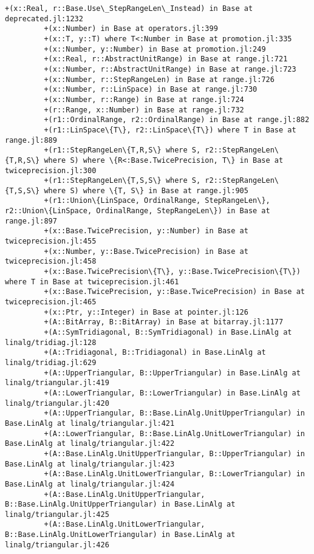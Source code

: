 \documentclass[11pt]{article}
\begin{document}
\begin{Verbatim}[commandchars=\\\{\}]
         +(x::Real, r::Base.Use\_StepRangeLen\_Instead) in Base at deprecated.jl:1232
         +(x::Number) in Base at operators.jl:399
         +(x::T, y::T) where T<:Number in Base at promotion.jl:335
         +(x::Number, y::Number) in Base at promotion.jl:249
         +(x::Real, r::AbstractUnitRange) in Base at range.jl:721
         +(x::Number, r::AbstractUnitRange) in Base at range.jl:723
         +(x::Number, r::StepRangeLen) in Base at range.jl:726
         +(x::Number, r::LinSpace) in Base at range.jl:730
         +(x::Number, r::Range) in Base at range.jl:724
         +(r::Range, x::Number) in Base at range.jl:732
         +(r1::OrdinalRange, r2::OrdinalRange) in Base at range.jl:882
         +(r1::LinSpace\{T\}, r2::LinSpace\{T\}) where T in Base at range.jl:889
         +(r1::StepRangeLen\{T,R,S\} where S, r2::StepRangeLen\{T,R,S\} where S) where \{R<:Base.TwicePrecision, T\} in Base at twiceprecision.jl:300
         +(r1::StepRangeLen\{T,S,S\} where S, r2::StepRangeLen\{T,S,S\} where S) where \{T, S\} in Base at range.jl:905
         +(r1::Union\{LinSpace, OrdinalRange, StepRangeLen\}, r2::Union\{LinSpace, OrdinalRange, StepRangeLen\}) in Base at range.jl:897
         +(x::Base.TwicePrecision, y::Number) in Base at twiceprecision.jl:455
         +(x::Number, y::Base.TwicePrecision) in Base at twiceprecision.jl:458
         +(x::Base.TwicePrecision\{T\}, y::Base.TwicePrecision\{T\}) where T in Base at twiceprecision.jl:461
         +(x::Base.TwicePrecision, y::Base.TwicePrecision) in Base at twiceprecision.jl:465
         +(x::Ptr, y::Integer) in Base at pointer.jl:126
         +(A::BitArray, B::BitArray) in Base at bitarray.jl:1177
         +(A::SymTridiagonal, B::SymTridiagonal) in Base.LinAlg at linalg/tridiag.jl:128
         +(A::Tridiagonal, B::Tridiagonal) in Base.LinAlg at linalg/tridiag.jl:629
         +(A::UpperTriangular, B::UpperTriangular) in Base.LinAlg at linalg/triangular.jl:419
         +(A::LowerTriangular, B::LowerTriangular) in Base.LinAlg at linalg/triangular.jl:420
         +(A::UpperTriangular, B::Base.LinAlg.UnitUpperTriangular) in Base.LinAlg at linalg/triangular.jl:421
         +(A::LowerTriangular, B::Base.LinAlg.UnitLowerTriangular) in Base.LinAlg at linalg/triangular.jl:422
         +(A::Base.LinAlg.UnitUpperTriangular, B::UpperTriangular) in Base.LinAlg at linalg/triangular.jl:423
         +(A::Base.LinAlg.UnitLowerTriangular, B::LowerTriangular) in Base.LinAlg at linalg/triangular.jl:424
         +(A::Base.LinAlg.UnitUpperTriangular, B::Base.LinAlg.UnitUpperTriangular) in Base.LinAlg at linalg/triangular.jl:425
         +(A::Base.LinAlg.UnitLowerTriangular, B::Base.LinAlg.UnitLowerTriangular) in Base.LinAlg at linalg/triangular.jl:426

\end{Verbatim}
\end{document}
